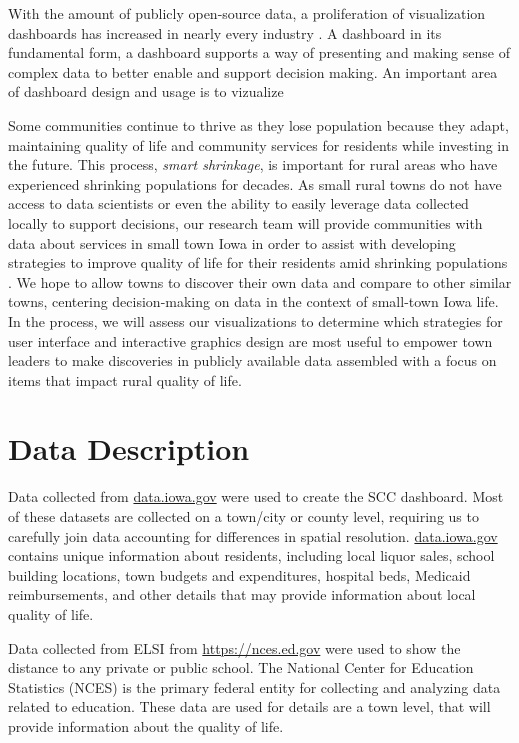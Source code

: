 \documentclass[letterpaper,inpress]{jdsart}
\begin{document}
With the amount of publicly open-source data, a proliferation of visualization dashboards has increased in nearly every industry \cite{fisher}.
A dashboard in its fundamental form, a dashboard supports a way of presenting and making sense of complex data to better enable and support decision making. An important area of dashboard design and usage is to vizualize

Some communities continue to thrive as they lose population because they adapt, maintaining quality of life and community services for residents while investing in the future.
This process, \emph{smart shrinkage}, is important for rural areas who have experienced shrinking populations for decades. As small rural towns do not have access to data scientists or even the ability to easily leverage data collected locally to support decisions, our research team will provide communities with data about services in small town Iowa in order to assist with developing strategies to improve quality of life for their residents amid shrinking populations \cite{scc}. We hope to allow towns to discover their own data and compare to other similar towns, centering decision-making on data in the context of small-town Iowa life. In the process, we will assess our visualizations to determine which strategies for user interface and interactive graphics design are most useful to empower town leaders to make discoveries in publicly available data assembled with a focus on items that impact rural quality of life.

\section{Data Description}

Data collected from \url{data.iowa.gov} were used to create the SCC dashboard. Most of these datasets are collected on a town/city or county level, requiring us to carefully join data accounting for differences in spatial resolution. \url{data.iowa.gov} contains unique information about residents, including local liquor sales, school building locations, town budgets and expenditures, hospital beds, Medicaid reimbursements, and other details that may provide information about local quality of life.

Data collected from ELSI from \url{https://nces.ed.gov} were used to show the distance to any private or public school. The National Center for Education Statistics (NCES) is the primary federal entity for collecting and analyzing data related to education. These data are used for details are a town level, that will provide information about the quality of life.
\end{document}
